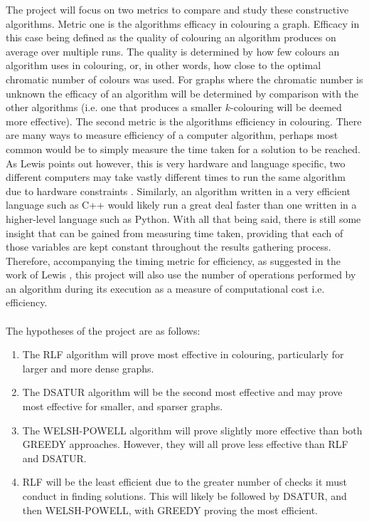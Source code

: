 The project will focus on two metrics to compare and study these constructive algorithms. Metric one is the algorithms efficacy in colouring a graph. Efficacy in this case being defined as the quality of colouring an algorithm produces on average over multiple runs. The quality is determined by how few colours an algorithm uses in colouring, or, in other words, how close to the optimal chromatic number of colours was used. For graphs where the chromatic number is unknown the efficacy of an algorithm will be determined by comparison with the other algorithms (i.e. one that produces a smaller $k$-colouring will be deemed more effective). The second metric is the algorithms efficiency in colouring. There are many ways to measure efficiency of a computer algorithm, perhaps most common would be to simply measure the time taken for a solution to be reached. As Lewis points out however, this is very hardware and language specific, two different computers may take vastly different times to run the same algorithm due to hardware constraints \cite{LewisR.M.R2015AGtG}. Similarly, an algorithm written in a very efficient language such as C++ would likely run a great deal faster than one written in a higher-level language such as Python. With all that being said, there is still some insight that can be gained from measuring time taken, providing that each of those variables are kept constant throughout the results gathering process. Therefore, accompanying the timing metric for efficiency, as suggested in the work of Lewis \cite{LewisR.M.R2015AGtG},  this project will also use  the number of operations performed by an algorithm during its execution as a measure of computational cost i.e. efficiency.
\\\\
The hypotheses of the project are as follows:
\begin{enumerate}
    \item The RLF algorithm will prove most effective in colouring, particularly for larger and more dense graphs.
    \item The DSATUR algorithm will be the second most effective and may prove most effective for smaller, and sparser graphs.
    \item The WELSH-POWELL algorithm will prove slightly more effective than both GREEDY approaches. However, they will all prove less effective than RLF and DSATUR.
    \item RLF will be the least efficient due to the greater number of checks it must conduct in finding solutions. This will likely be followed by DSATUR, and then WELSH-POWELL, with GREEDY proving the most efficient. 
\end{enumerate}

